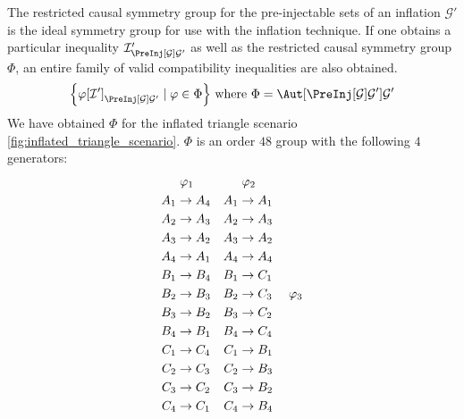 \documentclass[aps, 10pt, english, twoside, pra, nofootinbib, longbibliography]{revtex4-1}
\theoremstyle{plain}
\theoremstyle{definition}
\theoremstyle{remark}
\newcommand{\graph}{\mathcal{G}}
\newcommand{\gelem}{\varphi}
\newcommand{\action}[1]{\gelem\bs{#1}}
\begin{document}
    The restricted causal symmetry group for the pre-injectable sets of an inflation $\graph'$ is the ideal symmetry group for use with the inflation technique. If one obtains a particular inequality $\mathcal{I}'_{\PreInj[\graph]{\graph'}}$ as well as the restricted causal symmetry group $\Phi$, an entire family of valid compatibility inequalities are also obtained.
    \[ \bc{\action{\mathcal{I}'}_{\PreInj[\graph]{\graph'}} \mid \gelem \in \Phi} \text{ where } \Phi = \Aut[\PreInj[\graph]{\graph'}]{\graph'} \]
    We have obtained $\Phi$ for the inflated triangle scenario \cref{fig:inflated_triangle_scenario}. $\Phi$ is an order $48$ group with the following $4$ generators:
    \begin{equation*}
    \begin{aligned}[c]
    &\hspace{1mm}\gelem_1 \\
    A_1 &\to A_4 \\A_2 &\to A_3 \\A_3 &\to A_2 \\A_4 &\to A_1 \\B_1 &\to B_4 \\B_2 &\to B_3 \\B_3 &\to B_2 \\B_4 &\to B_1 \\C_1 &\to C_4 \\C_2 &\to C_3 \\C_3 &\to C_2 \\C_4 &\to C_1
    \end{aligned}
    \quad
    \begin{aligned}[c]
    &\hspace{1mm}\gelem_2 \\
    A_1 &\to A_1 \\A_2 &\to A_3 \\A_3 &\to A_2 \\A_4 &\to A_4 \\B_1 &\to C_1 \\B_2 &\to C_3 \\B_3 &\to C_2 \\B_4 &\to C_4 \\C_1 &\to B_1 \\C_2 &\to B_3 \\C_3 &\to B_2 \\C_4 &\to B_4
    \end{aligned}
    \quad
    \begin{aligned}[c]
    &\hspace{1mm}\gelem_3 \\

\end{aligned}
\end{equation*}
\end{document}
